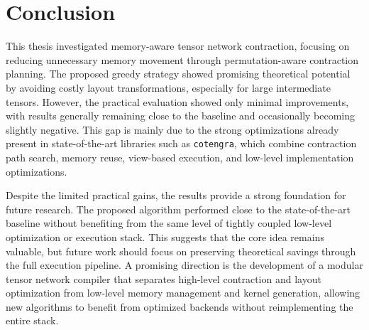 
\chapter{Conclusion}\label{chap:conclusion}

This thesis investigated memory-aware tensor network contraction, focusing on reducing unnecessary memory movement through permutation-aware contraction planning. The proposed greedy strategy showed promising theoretical potential by avoiding costly layout transformations, especially for large intermediate tensors. However, the practical evaluation showed only minimal improvements, with results generally remaining close to the baseline and occasionally becoming slightly negative. This gap is mainly due to the strong optimizations already present in state-of-the-art libraries such as \texttt{cotengra}, which combine contraction path search, memory reuse, view-based execution, and low-level implementation optimizations.

Despite the limited practical gains, the results provide a strong foundation for future research. The proposed algorithm performed close to the state-of-the-art baseline without benefiting from the same level of tightly coupled low-level optimization or execution stack. This suggests that the core idea remains valuable, but future work should focus on preserving theoretical savings through the full execution pipeline. A promising direction is the development of a modular tensor network compiler that separates high-level contraction and layout optimization from low-level memory management and kernel generation, allowing new algorithms to benefit from optimized backends without reimplementing the entire stack.
